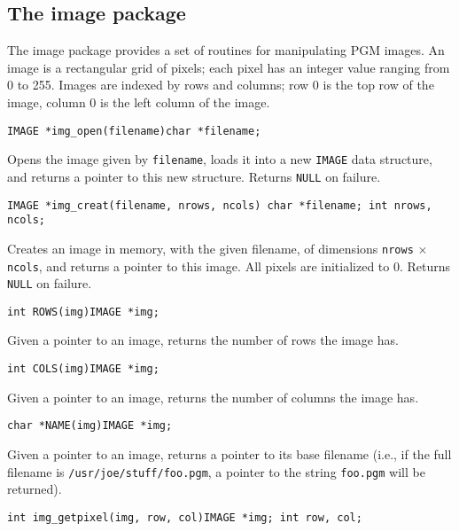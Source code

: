 \subsection{The image package}

The image package provides a set of routines for manipulating PGM images.
An image is a rectangular grid of pixels; each pixel has an integer value
ranging from 0 to 255.  Images are indexed by rows and columns; row 0
is the top row of the image, column 0 is the left column of the image.

\begin{description}

\item {\tt IMAGE *img\_open(filename)\newline char *filename;}

Opens the image given by {\tt filename}, loads it into a new {\tt IMAGE}
data structure, and returns a pointer to this new structure.
Returns {\tt NULL} on failure.

\item {\tt IMAGE *img\_creat(filename, nrows, ncols)\newline
char *filename;\newline
int nrows, ncols;}

Creates an image in memory, with the given filename, of dimensions
{\tt nrows} $\times$ {\tt ncols}, and returns a pointer to this image.
All pixels are initialized to 0.  Returns {\tt NULL} on failure.

\item {\tt int ROWS(img)\newline IMAGE *img;}

Given a pointer to an image, returns the number of rows the image has.

\item {\tt int COLS(img)\newline IMAGE *img;}

Given a pointer to an image, returns the number of columns the image has.

\item {\tt char *NAME(img)\newline IMAGE *img;}

Given a pointer to an image, returns a pointer to its base filename
(i.e., if the full
filename is {\tt /usr/joe/stuff/foo.pgm}, a pointer to the string
{\tt foo.pgm} will be returned).

\item {\tt int img\_getpixel(img, row, col)\newline IMAGE *img;\newline
int row, col;}


\end{description}
